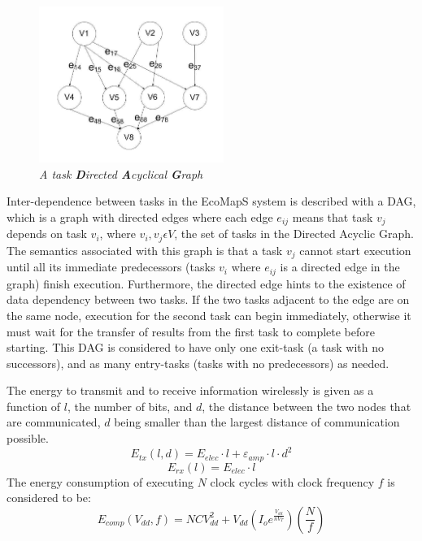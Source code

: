 \begin{figure}
  \begin{center}
    \includegraphics[width=60mm]{related/dag.png}
  \end{center}
  \caption{\small \itshape{ A task \textbf{D}irected \textbf{A}cyclical \textbf{G}raph}}
\end{figure}
Inter-dependence between tasks in the EcoMapS system is described with a DAG, which is a graph with directed edges where each edge
$e_{ij}$ means that task $v_j$ depends on task $v_i$, where  $v_i, v_j \epsilon V$, the set of tasks in the Directed Acyclic Graph.
The semantics associated with this graph is that a task $v_j$ cannot start execution until all its immediate predecessors (tasks 
$v_i$ where $e_{ij}$ is a directed edge in the graph) finish execution. Furthermore, the directed edge hints to the existence of 
data dependency between two tasks. If the two tasks adjacent to the edge are on the same node, execution for the second task can
begin immediately, otherwise it must wait for the transfer of results from the first task to complete before starting. This DAG 
is considered to have only one exit-task (a task with no successors), and as many entry-tasks (tasks with no predecessors) as needed.

The energy to transmit and to receive information wirelessly is given as a function of $l$, the number of bits, and $d$, the distance
between the two nodes that are communicated, $d$ being smaller than the largest distance of communication possible.
\begin{equation}
\label{energy1}
E_{tx} (l,d) = E_{elec} \cdot l + \varepsilon_{amp} \cdot l \cdot d^2
\end{equation}
\begin{equation}
E_{rx} (l) = E_{elec} \cdot l
\end{equation}
The energy consumption of executing $N$ clock cycles with clock frequency $f$ is considered to be:
\begin{equation}
E_{comp}(V_{dd},f) = NCV_{dd}^2 + V_{dd} (I_oe^{\frac{V_{dd}}{n V_T}})(\frac{N}{f})
\end{equation}


